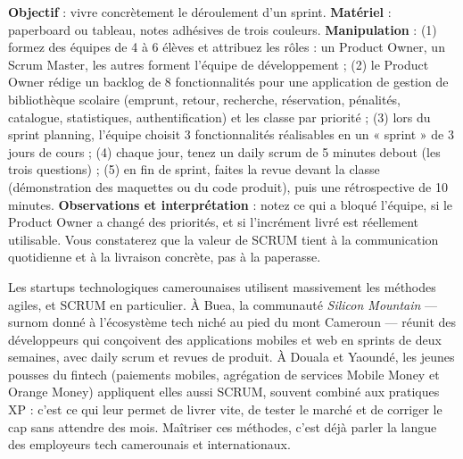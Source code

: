 \documentclass[11pt]{article}
\begin{document}
\begin{experience}
\textbf{Objectif} : vivre concrètement le déroulement d'un sprint. \textbf{Matériel} : paperboard ou tableau, notes adhésives de trois couleurs. \textbf{Manipulation} : (1) formez des équipes de 4 à 6 élèves et attribuez les rôles : un Product Owner, un Scrum Master, les autres forment l'équipe de développement ; (2) le Product Owner rédige un backlog de 8 fonctionnalités pour une application de gestion de bibliothèque scolaire (emprunt, retour, recherche, réservation, pénalités, catalogue, statistiques, authentification) et les classe par priorité ; (3) lors du sprint planning, l'équipe choisit 3 fonctionnalités réalisables en un « sprint » de 3 jours de cours ; (4) chaque jour, tenez un daily scrum de 5 minutes debout (les trois questions) ; (5) en fin de sprint, faites la revue devant la classe (démonstration des maquettes ou du code produit), puis une rétrospective de 10 minutes. \textbf{Observations et interprétation} : notez ce qui a bloqué l'équipe, si le Product Owner a changé des priorités, et si l'incrément livré est réellement utilisable. Vous constaterez que la valeur de SCRUM tient à la communication quotidienne et à la livraison concrète, pas à la paperasse.
\end{experience}

\begin{savaistu}
Les startups technologiques camerounaises utilisent massivement les méthodes agiles, et SCRUM en particulier. À Buea, la communauté \emph{Silicon Mountain} — surnom donné à l'écosystème tech niché au pied du mont Cameroun — réunit des développeurs qui conçoivent des applications mobiles et web en sprints de deux semaines, avec daily scrum et revues de produit. À Douala et Yaoundé, les jeunes pousses du fintech (paiements mobiles, agrégation de services Mobile Money et Orange Money) appliquent elles aussi SCRUM, souvent combiné aux pratiques XP : c'est ce qui leur permet de livrer vite, de tester le marché et de corriger le cap sans attendre des mois. Maîtriser ces méthodes, c'est déjà parler la langue des employeurs tech camerounais et internationaux.
\end{savaistu}
\end{document}
